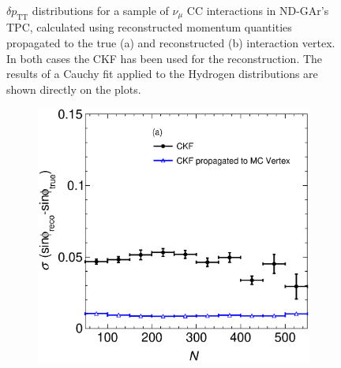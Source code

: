 \begin{figure}[t]
\begin{subfigure}[b]{0.48\textwidth}
         \caption{}  \label{fig:dpTT_ALICEStRecoGArReco}
     \end{subfigure}
        \caption{$\delta p_\text{TT}$ distributions for a sample of $\nu_\mu$ CC interactions in ND-GAr's TPC, calculated using reconstructed momentum quantities propagated to the true (a) and reconstructed (b) interaction vertex. In both cases the CKF has been used for the reconstruction. The results of a Cauchy fit applied to the Hydrogen distributions are shown directly on the plots. } \label{fig:dpTTVertex}
\end{figure}

\begin{figure}[t]
     \centering
     \begin{subfigure}{0.32\textwidth}
         \centering
         \includegraphics[width=\textwidth]{figures/ch6-TKI/sinphiRes/RessinphiVSNPoints_VertexComparison_13.eps}
         \caption{} \label{fig:RessinphiVSNPoints_VertexComparison_13}
     \end{subfigure}
     \begin{subfigure}{0.32\textwidth}
         \centering

\end{subfigure}
\end{figure}

